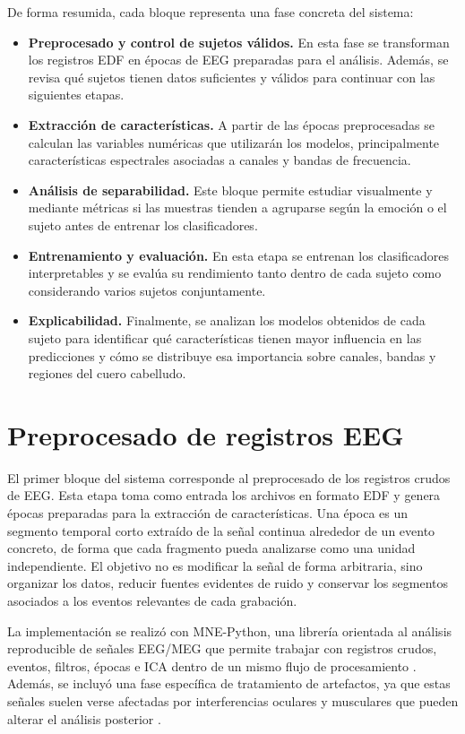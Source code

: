 De forma resumida, cada bloque representa una fase concreta del sistema:


\begin{itemize}
    \item \textbf{Preprocesado y control de sujetos válidos.} En esta fase se transforman los registros \ac{EDF} en épocas de \ac{EEG} preparadas para el análisis. Además, se revisa qué sujetos tienen datos suficientes y válidos para continuar con las siguientes etapas.
    \item \textbf{Extracción de características.} A partir de las épocas preprocesadas se calculan las variables numéricas que utilizarán los modelos, principalmente características espectrales asociadas a canales y bandas de frecuencia.
    \item \textbf{Análisis de separabilidad.} Este bloque permite estudiar visualmente y mediante métricas si las muestras tienden a agruparse según la emoción o el sujeto antes de entrenar los clasificadores.
    \item \textbf{Entrenamiento y evaluación.} En esta etapa se entrenan los clasificadores interpretables y se evalúa su rendimiento tanto dentro de cada sujeto como considerando varios sujetos conjuntamente.
    \item \textbf{Explicabilidad.} Finalmente, se analizan los modelos obtenidos de cada sujeto para identificar qué características tienen mayor influencia en las predicciones y cómo se distribuye esa importancia sobre canales, bandas y regiones del cuero cabelludo.
\end{itemize}

\section{Preprocesado de registros EEG}

El primer bloque del sistema corresponde al preprocesado de los registros crudos de \ac{EEG}. Esta etapa toma como entrada los archivos en formato \ac{EDF} y genera épocas preparadas para la extracción de características. Una época es un segmento temporal corto extraído de la señal continua alrededor de un evento concreto, de forma que cada fragmento pueda analizarse como una unidad independiente. El objetivo no es modificar la señal de forma arbitraria, sino organizar los datos, reducir fuentes evidentes de ruido y conservar los segmentos asociados a los eventos relevantes de cada grabación.


La implementación se realizó con MNE-Python, una librería orientada al análisis reproducible de señales \ac{EEG}/\ac{MEG} que permite trabajar con registros crudos, eventos, filtros, épocas e \ac{ICA} dentro de un mismo flujo de procesamiento \cite{gramfort2013mne}. Además, se incluyó una fase específica de tratamiento de artefactos, ya que estas señales suelen verse afectadas por interferencias oculares y musculares que pueden alterar el análisis posterior \cite{uriguen2015artifact}.

